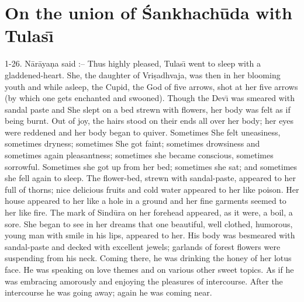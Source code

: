 \chapter{On the union of \'Sankhach\=uda with Tulas\={\i}}

1-26. N\=ar\=aya\d{n}a said :-- Thus highly pleased, Tulas\={\i} went to sleep with a gladdened-heart. She, the daughter of Vri\d{s}adhvaja, was then in her blooming youth and while asleep, the Cupid, the God of five arrows, shot at her five arrows (by which one gets enchanted and swooned). Though the Dev\={\i} was smeared with sandal paste and She slept on a bed strewn with flowers, her body was felt as if being burnt. Out of joy, the hairs stood on their ends all over her body; her eyes were reddened and her body began to quiver. Sometimes She felt uneasiness, sometimes dryness; sometimes She got faint; sometimes drowsiness and sometimes again pleasantness; sometimes she became conscious, sometimes sorrowful. Sometimes she got up from her bed; sometimes she sat; and sometimes she fell again to sleep. The flower-bed, strewn with sandal-paste, appeared to her full of thorns; nice delicious fruits and cold water appeared to her like poison. Her house appeared to her like a hole in a ground and her fine garments seemed to her like fire. The mark of Sind\=ura on her forehead appeared, as it were, a boil, a sore. She began to see in her dreams that one beautiful, well clothed, humorous, young man with smile in his lips, appeared to her. His body was besmeared with sandal-paste and decked with excellent jewels; garlands of forest flowers were suspending from his neck. Coming there, he was drinking the honey of her lotus face. He was speaking on love themes and on various other sweet topics. As if he was embracing amorously and enjoying the pleasures of intercourse. After the intercourse he was going away; again he was coming near.


